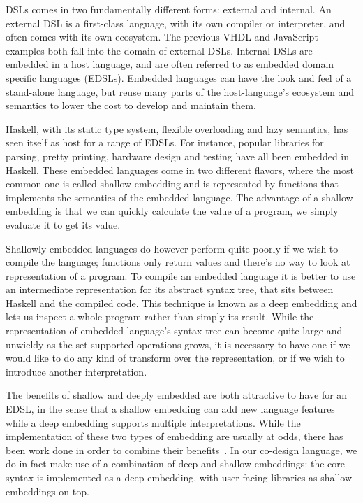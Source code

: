 DSLs comes in two fundamentally different forms: external and internal. An external DSL is a first-class language, with its own compiler or interpreter, and often comes with its own ecosystem. The previous VHDL and JavaScript examples both fall into the domain of external DSLs. Internal DSLs are embedded in a host language, and are often referred to as embedded domain specific languages (EDSLs). Embedded languages can have the look and feel of a stand-alone language, but reuse many parts of the host-language's ecosystem and semantics to lower the cost to develop and maintain them.

Haskell, with its static type system, flexible overloading and lazy semantics, has seen itself as host for a range of EDSLs. For instance, popular libraries for parsing, pretty printing, hardware design and testing have all been embedded in Haskell. These embedded languages come in two different flavors, where the most common one is called shallow embedding and is represented by functions that implements the semantics of the embedded language. The advantage of a shallow embedding is that we can quickly calculate the value of a program, we simply evaluate it to get its value.

Shallowly embedded languages do however perform quite poorly if we wish to compile the language; functions only return values and there's no way to look at representation of a program. To compile an embedded language it is better to use an intermediate representation for its abstract syntax tree, that sits between Haskell and the compiled code. This technique is known as a deep embedding and lets us inspect a whole program rather than simply its result. While the representation of embedded language's syntax tree can become quite large and unwieldy as the set supported operations grows, it is necessary to have one if we would like to do any kind of transform over the representation, or if we wish to introduce another interpretation.

The benefits of shallow and deeply embedded are both attractive to have for an EDSL, in the sense that a shallow embedding can add new language features while a deep embedding supports multiple interpretations. While the implementation of these two types of embedding are usually at odds, there has been work done in order to combine their benefits~\cite{svenningsson2012}. In our co-design language, we do in fact make use of a combination of deep and shallow embeddings: the core syntax is implemented as a deep embedding, with user facing libraries as shallow embeddings on top. %


